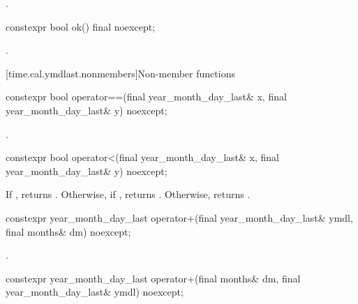 \begin{itemdescr}
\pnum
\returns {}.
\end{itemdescr}

%
\begin{itemdecl}
constexpr bool ok() final noexcept;
\end{itemdecl}

\begin{itemdescr}
\pnum
\returns {}.
\end{itemdescr}

[time.cal.ymdlast.nonmembers]{Non-member functions}

%
\begin{itemdecl}
constexpr bool operator==(final year_month_day_last& x, final year_month_day_last& y) noexcept;
\end{itemdecl}

\begin{itemdescr}
\pnum
\returns {}.
\end{itemdescr}

%
\begin{itemdecl}
constexpr bool operator<(final year_month_day_last& x, final year_month_day_last& y) noexcept;
\end{itemdecl}

\begin{itemdescr}
\pnum
\returns
If , returns .
Otherwise, if , returns .
Otherwise, returns .
\end{itemdescr}

%
\begin{itemdecl}
constexpr year_month_day_last
  operator+(final year_month_day_last& ymdl, final months& dm) noexcept;
\end{itemdecl}

\begin{itemdescr}
\pnum
\returns {}.
\end{itemdescr}

%
\begin{itemdecl}
constexpr year_month_day_last
  operator+(final months& dm, final year_month_day_last& ymdl) noexcept;
\end{itemdecl}


